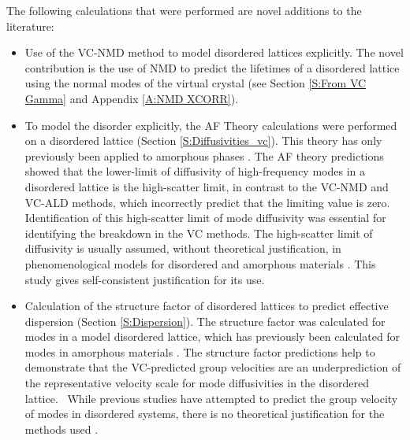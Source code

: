 The following calculations that were performed are novel additions 
to the literature:
\begin{itemize}
\item Use of the VC-NMD method to model disordered 
lattices explicitly. The novel contribution is the use of 
NMD to predict the lifetimes of a disordered lattice using 
the normal modes of the virtual crystal 
(see Section \ref{S:From VC Gamma} and Appendix \ref{A:NMD XCORR}).
\item  To model the disorder explicitly, the AF Theory calculations 
were performed on a disordered lattice 
(Section \ref{S:Diffusivities_vc}). 
This theory has only previously been applied to amorphous phases 
\cite{feldman_thermal_1993,feldman_numerical_1999,
shenogin_predicting_2009,he_heat_2011}.
The AF theory predictions showed that the lower-limit 
of diffusivity of high-frequency modes in a disordered lattice is the 
high-scatter limit, in contrast to the VC-NMD and VC-ALD methods, 
which incorrectly 
predict that the limiting value is zero. Identification of this 
high-scatter limit of mode diffusivity was essential for identifying 
the breakdown in the VC methods.  The high-scatter limit of 
diffusivity is usually assumed, without theoretical justification, in 
phenomenological models for disordered and amorphous materials 
\cite{kittel_interpretation_1949,graebner_phonon_1986,
cahill_lattice_1988}. 
This study gives self-consistent justification for its use.
\item Calculation of the structure factor of disordered lattices to 
predict effective dispersion (Section \ref{S:Dispersion}). 
The structure factor was calculated for modes in a model disordered 
lattice, which has previously been calculated for modes in amorphous 
materials 
\cite{biswas_vibrational_1988,feldman_thermal_1993,
allen_diffusons_1999,feldman_numerical_1999,
taraskin_determination_1999,taraskin_propagation_2000,
volz_molecular-dynamics_2000,
gotze_evolution_2000,horbach_high_2001,
martin-mayor_dynamical_2001,feldman_calculations_2002,
ciliberti_brillouin_2003,christie_vibrational_2007,
shintani_universal_2008,wyart_scaling_2010,
beltukov_ioffe-regel_2013,larkin_predicting_2013,
marruzzo_heterogeneous_2013}. 
The structure factor predictions help to 
demonstrate that the VC-predicted group velocities are an 
underprediction of the representative velocity scale for mode 
diffusivities in the disordered lattice.  While previous studies 
have attempted to predict the group velocity of modes in disordered 
systems, there is no theoretical justification for the methods used 
\cite{duda_reducing_2011,donadio_atomistic_2009,
he_heat_2011,he_thermal_2011,he_morphology_2011,hori_phonon_2013}. 
\end{itemize}

